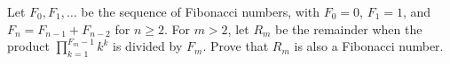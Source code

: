 Let $F_0, F_1, \dots$ be the sequence of Fibonacci numbers, with $F_0 = 0$, $F_1 = 1$, and $F_n = F_{n-1} + F_{n-2}$ for $n \geq 2$. For $m > 2$, let $R_m$ be the remainder when the product $\prod_{k=1}^{F_m-1} k^k$ is divided by $F_m$. Prove that $R_m$ is also a Fibonacci number.
